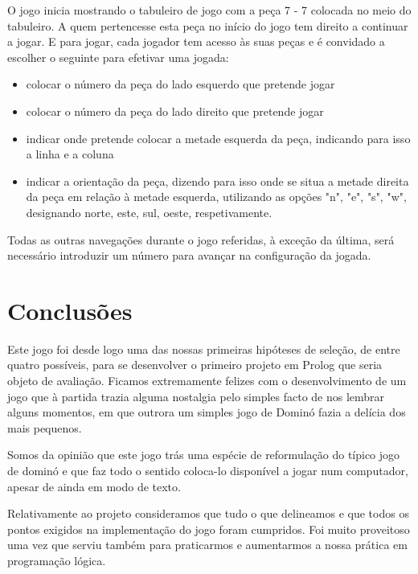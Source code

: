 \documentclass[a4paper]{article}
\begin{document}
O jogo inicia mostrando o tabuleiro de jogo com a peça 7 - 7 colocada no meio do tabuleiro. A quem pertencesse esta peça no início do jogo tem direito a continuar a jogar. E para jogar, cada jogador tem acesso às suas peças e é convidado a escolher o seguinte para efetivar uma jogada:

\begin{itemize}
\item colocar o número da peça do lado esquerdo que pretende jogar
\item colocar o número da peça do lado direito que pretende jogar
\item indicar onde pretende colocar a metade esquerda da peça, indicando para isso a linha e a coluna
\item indicar a orientação da peça, dizendo para isso onde se situa a metade direita da peça em relação à metade esquerda, utilizando as opções "n", "e", "s", "w", designando norte, este, sul, oeste, respetivamente.
\end{itemize}

Todas as outras navegações durante o jogo referidas, à exceção da última, será necessário introduzir um número para avançar na configuração da jogada.



\section{Conclusões}

Este jogo foi desde logo uma das nossas primeiras hipóteses de seleção, de entre quatro possíveis, para se desenvolver o primeiro projeto em Prolog que seria objeto de avaliação. Ficamos extremamente felizes com o desenvolvimento de um jogo que à partida trazia alguma nostalgia pelo simples facto de nos lembrar alguns momentos, em que outrora um simples jogo de Dominó fazia a delícia dos mais pequenos. 

Somos da opinião que este jogo trás uma espécie de reformulação do típico jogo de dominó e que faz todo o sentido coloca-lo disponível a jogar num computador, apesar de ainda em modo de texto.

Relativamente ao projeto consideramos que tudo o que delineamos e que todos os pontos exigidos na implementação do jogo foram cumpridos. Foi muito proveitoso uma vez que serviu também para praticarmos e aumentarmos a nossa prática em programação lógica.
\end{document}
